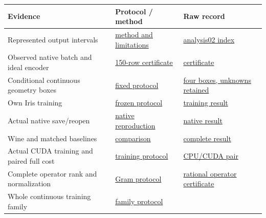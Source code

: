 \documentclass[
  10pt,
]{article}
\begin{document}
\begin{longtable}[]{@{}
  >{\raggedright\arraybackslash}p{}
  >{\raggedright\arraybackslash}p{}
  >{\raggedright\arraybackslash}p{}@{}}
\toprule
Evidence & Protocol / method & Raw record \\
\midrule
\endhead
Represented output intervals &
\href{../OBSERVED_GRAPH_OUTPUT_CERTIFICATION_2026-10-09.md}{method and
limitations} &
\href{../validation/observed-graph-output-enclosure-2026-10-09/analysis02/evidence_index.json}{analysis02
index} \\
Observed native batch and ideal encoder &
\href{../NATIVE_TRAINING_BATCH_CERTIFICATION_2026-10-09.md}{150-row
certificate} &
\href{../validation/native-training-batch-certificate-2026-10-09/analysis01/worker/certificate.json}{certificate} \\
Conditional continuous geometry boxes &
\href{../CONDITIONAL_PARAMETER_BOX_PROTOCOL_2026-10-09.md}{fixed
protocol} &
\href{../validation/native-parameter-boxes-2026-10-09/analysis01/worker/certificate.json}{four
boxes, unknowns retained} \\
Own Iris training &
\href{../CAPTURED_GEOMETRY_TRAINING_PROTOCOL_2026-10-09.md}{frozen
protocol} &
\href{../validation/captured-geometry-training-2026-10-09/attempt01/worker/result.json}{training
result} \\
Actual native save/reopen &
\href{../TRAINED_GEOMETRY_BLENDER_REPRODUCTION_2026-10-09.md}{native
reproduction} &
\href{../validation/trained-geometry-blender-reproduction-2026-10-09/attempt01/worker/result.json}{native
result} \\
Wine and matched baselines &
\href{../WINE_GENERALIZATION_COMPARISON_2026-10-09.md}{comparison} &
\href{../validation/wine-comparison-2026-10-09/attempt01/worker/result.json}{complete
result} \\
Actual CUDA training and paired full cost &
\href{../GEOMETRY_CUDA_TRAINING_PROTOCOL_2026-10-09.md}{training
protocol} &
\href{../validation/geometry-cuda-training-2026-10-09/attempt01/supervisor.json}{CPU/CUDA
pair} \\
Complete operator rank and normalization &
\href{../NATIVE_OPERATOR_GRAM_PROTOCOL_2026-10-09.md}{Gram protocol} &
\href{../validation/native-operator-gram-2026-10-09/analysis01/worker/certificate.json}{rational
operator certificate} \\
Whole continuous training family &
\href{../GLOBAL_TRAINING_FAMILY_PROTOCOL_2026-10-09.md}{family protocol}

\end{longtable}
\end{document}
